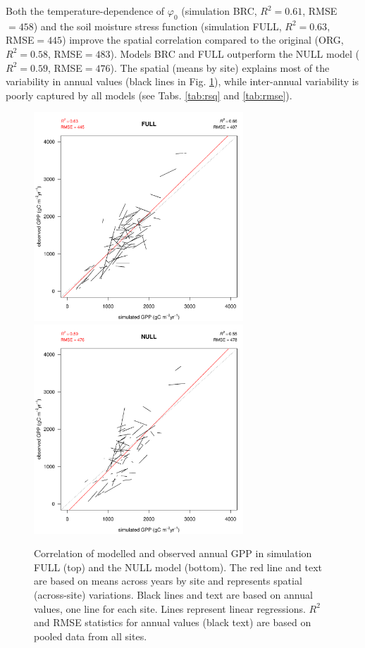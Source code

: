 \documentclass{myreport}
\begin{document}
Both the temperature-dependence of $\varphi_0$ (simulation BRC, $R^2=0.61$, RMSE$=458$) and the soil moisture stress function (simulation FULL, $R^2=0.63$, RMSE$=445$) improve the spatial correlation compared to the original (ORG, $R^2=0.58$, RMSE$=483$). Models BRC and FULL outperform the NULL model ($R^2=0.59$, RMSE$=476$). The spatial (means by site) explains most of the variability in annual values (black lines in Fig. \ref{fig:modobs_spatialannual}), while inter-annual variability is poorly captured by all models (see Tabs. \ref{tab:rsq} and \ref{tab:rmse}).

\begin{figure}[!ht]
    \centering
    \includegraphics[width=0.7\textwidth]{fig/modobs_spatial_annual_FULL.pdf}
    \includegraphics[width=0.7\textwidth]{fig/modobs_spatial_annual_NULL.pdf}
    \caption{Correlation of modelled and observed annual GPP in simulation FULL (top) and the NULL model (bottom). The red line and text are based on means across years by site and represents spatial (across-site) variations. Black lines and text are based on annual values, one line for each site. Lines represent linear regressions. $R^2$ and RMSE statistics for annual values (black text) are based on pooled data from all sites.}
    \label{fig:modobs_spatialannual}
\end{figure}
\end{document}
